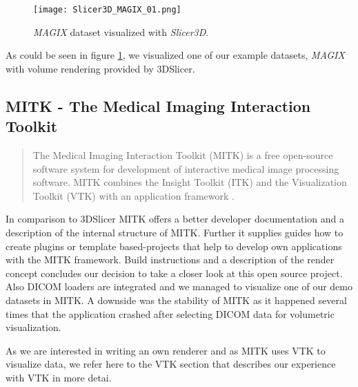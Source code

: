 
\begin{figure}[h]
	\centering
	\texttt{[image: Slicer3D\_MAGIX\_01.png]} \\
	\caption{ \emph{MAGIX}\cite{gimias_sampledata_2018} dataset visualized with \emph{Slicer3D}.}
	\label{fig:Slicer3D_MAGIX_01}
\end{figure}

As could be seen in figure \ref{fig:Slicer3D_MAGIX_01}, we visualized one of our example datasets, \emph{MAGIX} with volume rendering provided by 3DSlicer.


\subsection{MITK - The Medical Imaging Interaction Toolkit}

\blockquote{The Medical Imaging Interaction Toolkit (MITK) is a free open-source software system for development of interactive medical image processing software. MITK combines the Insight Toolkit (ITK) and the Visualization Toolkit (VTK) with an application framework \cite{MITK_2018}.}

In comparison to 3DSlicer MITK offers a better developer documentation and a description of the internal structure of MITK. Further it supplies guides how to create plugins or template based-projects that help to develop own applications with the MITK framework. Build instructions and a description of the render concept concludes our decision to take a closer look at this open source project.
Also DICOM loaders are integrated and we managed to visualize one of our demo datasets in MITK. A downside was the stability of MITK as it happened several times that the application crashed after selecting DICOM data for volumetric visualization.

As we are interested in writing an own renderer and as MITK uses VTK to visualize data, we refer here to the VTK section that describes our experience with VTK in more detai.



